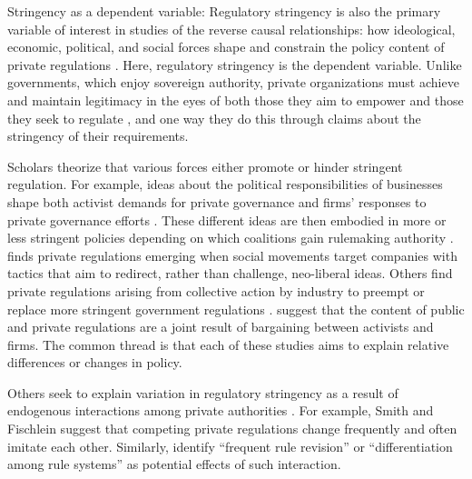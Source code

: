 \documentclass[
      12pt,
            Review ]{article}
\begin{document}
Stringency as a dependent variable: Regulatory stringency is also the
primary variable of interest in studies of the reverse causal
relationships: how ideological, economic, political, and social forces
shape and constrain the policy content of private regulations
\citep{Bartley2003, Cashore2004, Fischer2014}. Here, regulatory
stringency is the dependent variable. Unlike governments, which enjoy
sovereign authority, private organizations must achieve and maintain
legitimacy in the eyes of both those they aim to empower and those they
seek to regulate \citep{Bartley2007, Bodansky1999, Cashore2002}, and one
way they do this through claims about the stringency of their
requirements.

Scholars theorize that various forces either promote or hinder stringent
regulation. For example, ideas about the political responsibilities of
businesses shape both activist demands for private governance and firms'
responses to private governance efforts \citep{Bartley2003, Djelic2017}.
These different ideas are then embodied in more or less stringent
policies depending on which coalitions gain rulemaking authority
\citep{Botzem2012, Hsueh2012}. \citet{Bartley2003} finds private
regulations emerging when social movements target companies with tactics
that aim to redirect, rather than challenge, neo-liberal ideas. Others
find private regulations arising from collective action by industry to
preempt or replace more stringent government regulations
\citep{Bartley2007, Cashore2002, Grabosky2013, Green2013, Loconto2014, Lyon2008, Maxwell2000, Prakash2000}.
\citet{Abbott2009} suggest that the content of public and private
regulations are a joint result of bargaining between activists and
firms. The common thread is that each of these studies aims to explain
relative differences or changes in policy.

Others seek to explain variation in regulatory stringency as a result of
endogenous interactions among private authorities
\citep{DeLeon2009, Eberlein2014, Green2017, Gulbrandsen2014, Howard-Grenville2008, Li2015, Mills2016d}.
For example, Smith and Fischlein \citeyearpar[p.~520]{Smith2010} suggest
that competing private regulations change frequently and often imitate
each other. Similarly, \citet{Eberlein2014} identify ``frequent rule
revision'' or ``differentiation among rule systems'' as potential
effects of such interaction.
\end{document}
